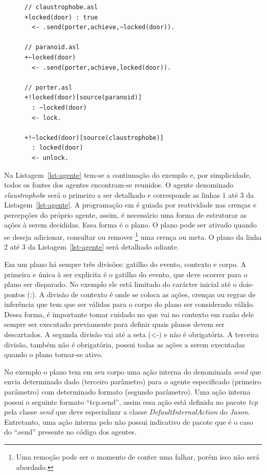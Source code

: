 \lstset{linewidth=75mm}
\begin{figure}
	\begin{lstlisting}[frame=trbl, caption=Agentes em ASL, label=lst-agente]
// claustrophobe.asl
+locked(door) : true
  <- .send(porter,achieve,~locked(door)).

// paranoid.asl
+~locked(door)
  <- .send(porter,achieve,locked(door)).

// porter.asl
+!locked(door)[source(paranoid)]
  : ~locked(door)
  <- lock.

+!~locked(door)[source(claustrophobe)]
  : locked(door)
  <- unlock.
	\end{lstlisting}
\end{figure}
%
Na Listagem~\ref{lst-agente} tem-se a continuação do exemplo e, por
simplicidade, todos os fontes dos agentes encontram-se reunidos. O agente denominado
\emph{claustrophobe} será o primeiro a ser detalhado e corresponde as linhas 1 até 3
da Listagem~\ref{lst-agente}. A programação em \jason é
guiada por reatividade nas crenças e percepções do próprio agente, assim, é necessário
uma forma de estruturar as ações à serem decididas. Essa forma é o plano.
O plano pode ser ativado quando se deseja adicionar, consultar ou remover \footnote{Uma remoção pode ser o momento de conter uma falhar, porém isso não será abordado.}
 uma crença ou meta. O plano da linha 2 até 3 da
Listagem~\ref{lst-agente} será detalhado adiante.

Em um plano há sempre três divisões: gatilho do evento, contexto e corpo.
A primeira e única à ser explicita é o gatilho do evento, que deve ocorrer para
o plano ser disparado. No exemplo ele está limitado do carácter inicial até
o dois-pontos (:). A divisão de contexto é onde se coloca as ações, crenças
ou regras de inferência que tem que ser válidas para o corpo do plano ser
considerado válido. Dessa forma, é
importante tomar cuidado no que vai no contexto em razão dele sempre ser
executado previamente para definir quais planos devem ser descartados.
A segunda divisão vai até a seta (<-) e não é obrigatória.
A terceira divisão, também não é obrigatória, possui todas as ações a serem
executadas quando o plano tornar-se ativo.

No exemplo o plano tem em seu corpo
uma ação interna do \jason denominada \emph{send} que envia determinado dado
(terceiro parâmetro) para o agente especificado (primeiro parâmetro) com
determinado formato (segundo parâmetro). Uma ação interna possui o seguinte
formato ``tcp.send'', assim essa ação está definida no pacote \emph{tcp} pela
classe \emph{send} que deve especializar a classe \emph{DefaultInternalAction}
do \emph{Jason}. Entretanto, uma ação interna pelo \jason não possui
indicativo de pacote que é o caso do ``.send'' presente no código dos agentes.

